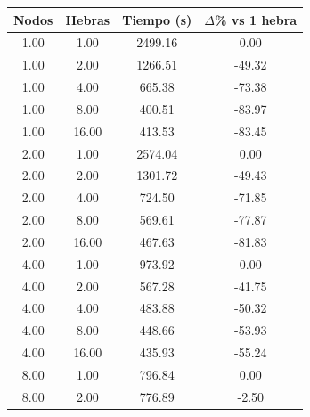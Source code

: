 \begin{table}[ht]
    \centering
    \begin{tabular}{|c|c|c|c|}
        \hline
        \textbf{Nodos} & \textbf{Hebras} & \textbf{Tiempo (s)} & \textbf{$\Delta$\% vs 1 hebra} \\
        \hline
        1.00           & 1.00            & 2499.16             & 0.00                           \\
        1.00           & 2.00            & 1266.51             & -49.32                         \\
        1.00           & 4.00            & 665.38              & -73.38                         \\
        1.00           & 8.00            & 400.51              & -83.97                         \\
        1.00           & 16.00           & 413.53              & -83.45                         \\
        2.00           & 1.00            & 2574.04             & 0.00                           \\
        2.00           & 2.00            & 1301.72             & -49.43                         \\
        2.00           & 4.00            & 724.50              & -71.85                         \\
        2.00           & 8.00            & 569.61              & -77.87                         \\
        2.00           & 16.00           & 467.63              & -81.83                         \\
        4.00           & 1.00            & 973.92              & 0.00                           \\
        4.00           & 2.00            & 567.28              & -41.75                         \\
        4.00           & 4.00            & 483.88              & -50.32                         \\
        4.00           & 8.00            & 448.66              & -53.93                         \\
        4.00           & 16.00           & 435.93              & -55.24                         \\
        8.00           & 1.00            & 796.84              & 0.00                           \\
        8.00           & 2.00            & 776.89              & -2.50                          \\

\end{tabular}
\end{table}
